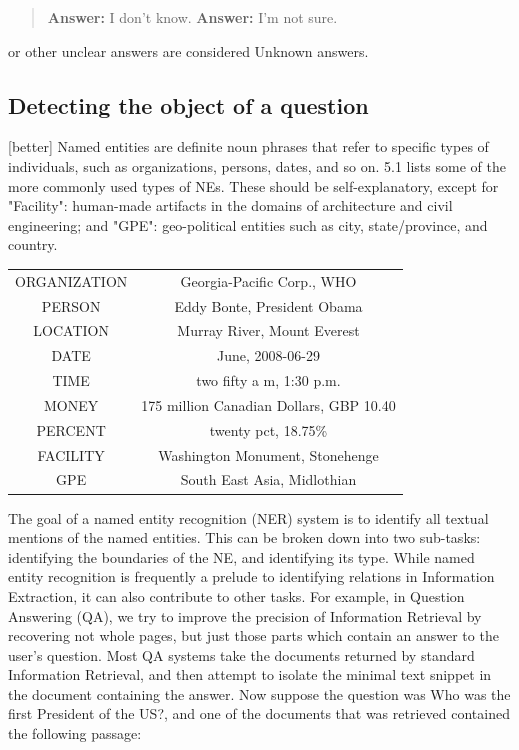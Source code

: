 \documentclass[LaM,binding=0.6cm]{sapthesis}
\begin{document}
\begin{quote}
\textbf{Answer:} I don't know.
\textbf{Answer:} I'm not sure.
\end{quote}

or other unclear answers are considered Unknown answers.

\subsection{Detecting the object of a question}
[better]
Named entities are definite noun phrases that refer to specific types of individuals, such as organizations, persons, dates, and so on. 5.1 lists some of the more commonly used types of NEs. These should be self-explanatory, except for "Facility": human-made artifacts in the domains of architecture and civil engineering; and "GPE": geo-political entities such as city, state/province, and country.



\begin{center}
\begin{tabular}{ c c }
ORGANIZATION &	Georgia-Pacific Corp., WHO \\
PERSON 	& Eddy Bonte, President Obama \\
LOCATION &	Murray River, Mount Everest\\
DATE &	June, 2008-06-29\\
TIME &	two fifty a m, 1:30 p.m.\\
MONEY &	175 million Canadian Dollars, GBP 10.40\\
PERCENT &	twenty pct, 18.75\% \\
FACILITY &	Washington Monument, Stonehenge\\
GPE &	South East Asia, Midlothian \\
\end{tabular}
\end{center}

The goal of a named entity recognition (NER) system is to identify all textual mentions of the named entities. This can be broken down into two sub-tasks: identifying the boundaries of the NE, and identifying its type. While named entity recognition is frequently a prelude to identifying relations in Information Extraction, it can also contribute to other tasks. For example, in Question Answering (QA), we try to improve the precision of Information Retrieval by recovering not whole pages, but just those parts which contain an answer to the user's question. Most QA systems take the documents returned by standard Information Retrieval, and then attempt to isolate the minimal text snippet in the document containing the answer. Now suppose the question was Who was the first President of the US?, and one of the documents that was retrieved contained the following passage:
\end{document}
